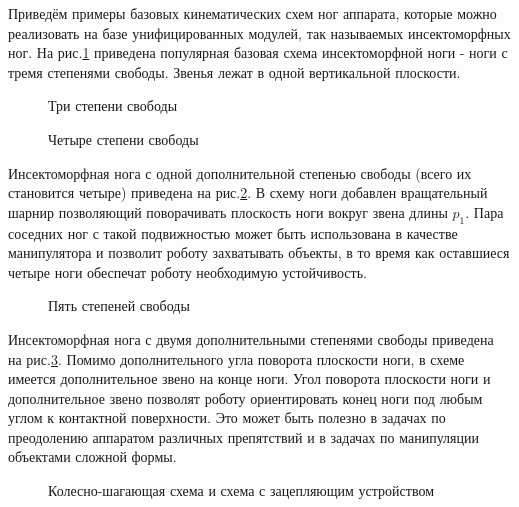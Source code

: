 Приведём примеры базовых кинематических схем ног аппарата, которые можно реализовать на базе унифицированных модулей, так называемых инсектоморфных ног.
На рис.\ref{fig1} приведена популярная базовая схема инсектоморфной ноги - ноги с тремя степенями свободы. Звенья лежат в одной вертикальной плоскости.

\begin{figure}[ht]
\caption{Три степени свободы}
\label{fig1}
\end{figure}

\begin{figure}[ht]
\caption{Четыре степени свободы}
\label{fig2}
\end{figure}

Инсектоморфная нога с одной дополнительной степенью свободы (всего их становится четыре) приведена на рис.\ref{fig2}. В схему ноги добавлен вращательный шарнир позволяющий поворачивать плоскость ноги вокруг звена длины $p_1$. Пара соседних ног с такой подвижностью может быть использована в качестве манипулятора\cite{Langosz2013,Roennau2013} и позволит роботу захватывать объекты, в то время как оставшиеся четыре ноги обеспечат роботу необходимую устойчивость.

\begin{figure}[ht]
\caption{Пять степеней свободы}
\label{fig3}
\end{figure} 

Инсектоморфная нога с двумя дополнительными степенями свободы приведена на рис.\ref{fig3}. Помимо дополнительного угла поворота плоскости ноги, в схеме имеется дополнительное звено на конце ноги. Угол поворота плоскости ноги и дополнительное звено позволят роботу ориентировать конец ноги под любым углом к контактной поверхности. Это может быть полезно в задачах по преодолению аппаратом различных препятствий и в задачах по манипуляции объектами сложной формы.

\begin{figure}
\begin{minipage}{0.49\linewidth}
\end{minipage}
\begin{minipage}{0.49\linewidth}
\end{minipage}
\caption{Колесно-шагающая схема и схема с зацепляющим устройством}
\label{fig4}
\label{fig5}
\end{figure}

